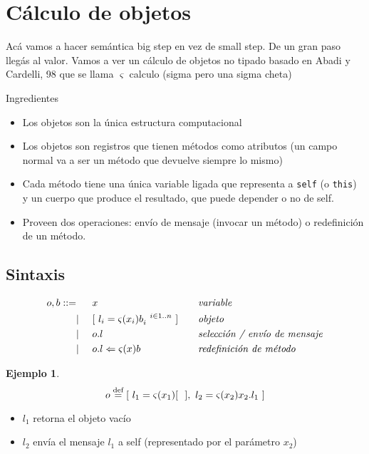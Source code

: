 \documentclass{report}
\theoremstyle{definition} %
\newtheorem*{example*}{Ejemplo}
\newcommand{\eqdef}{\overset{\text{def}}{=}}
\newcommand{\iesimo}[1]{#1_i^{\ \ i \in 1..n}}
\begin{document}
\section{Cálculo de objetos}

Acá vamos a hacer semántica big step en vez de small step. De un gran paso
llegás al valor. Vamos a ver un cálculo de objetos no tipado basado en Abadi y
Cardelli, 98 que se llama $\varsigma$ calculo (sigma pero una sigma cheta)

Ingredientes

\begin{itemize}
    \item Los objetos son la única estructura computacional
    \item Los objetos son registros que tienen métodos como atributos (un campo
    normal va a ser un método que devuelve siempre lo mismo)
    \item Cada método tiene una única variable ligada que representa a
    \texttt{self} (o \texttt{this}) y un cuerpo que produce el resultado, que
    puede depender o no de self.
    \item Proveen dos operaciones: envío de mensaje (invocar un método) o
    redefinición de un método.
\end{itemize}

\subsection{Sintaxis}

\begin{alignat*}{3}
    o, b ::=
    &  &&x  &&\text{\textit{variable}}\\
    &|\ &&\obj{\attr{l_i}{\met{x_i}{\iesimo{b}}}} 
    \quad&&\text{\textit{objeto}}\\
    &| &&\sel{o}{l} &&\text{\textit{selección / envío de mensaje}}\\
    &| &&\update{o}{l}{\met{x}{b}} &&\text{\textit{redefinición de método}}\\
\end{alignat*}

\begin{example*}
    \[
    o \eqdef \obj{
        \attr{l_1}{\met{x_1}{\obj{}}},\
        \attr{l_2}{\met{x_2}{\sel{x_2}{l_1}}}
    }
    \]

    \begin{itemize}
        \item $l_1$ retorna el objeto vacío
        \item $l_2$ envía el mensaje $l_1$ a self (representado por el parámetro $x_2$)
    \end{itemize}
\end{example*}
\end{document}
